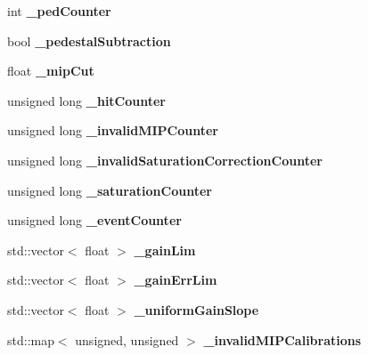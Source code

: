 \begin{DoxyCompactItemize}
\item 
int {\bfseries \-\_\-ped\-Counter}\label{classCALICE_1_1IntegratedScECALCalibrationProcessor_ad2e2dfb9ed38a0fb477e49422affe3db}

\item 
bool {\bfseries \-\_\-pedestal\-Subtraction}\label{classCALICE_1_1IntegratedScECALCalibrationProcessor_abb28167c1947ecb2fa63693acb5088a7}

\item 
float {\bfseries \-\_\-mip\-Cut}\label{classCALICE_1_1IntegratedScECALCalibrationProcessor_a9aa1b3b1267dfb7d9f93779f365171e2}

\item 
unsigned long {\bfseries \-\_\-hit\-Counter}\label{classCALICE_1_1IntegratedScECALCalibrationProcessor_ae7f0adccf76ae6c22c6e5f748d8c9899}

\item 
unsigned long {\bfseries \-\_\-invalid\-M\-I\-P\-Counter}\label{classCALICE_1_1IntegratedScECALCalibrationProcessor_a32073bf9073c927af764495b53a0dc97}

\item 
unsigned long {\bfseries \-\_\-invalid\-Saturation\-Correction\-Counter}\label{classCALICE_1_1IntegratedScECALCalibrationProcessor_a99fd828abc1342d785aaf6a68d78a94b}

\item 
unsigned long {\bfseries \-\_\-saturation\-Counter}\label{classCALICE_1_1IntegratedScECALCalibrationProcessor_a2d2db54c3e186e77f0f3a02ce8bf2254}

\item 
unsigned long {\bfseries \-\_\-event\-Counter}\label{classCALICE_1_1IntegratedScECALCalibrationProcessor_a934d12f20ce5258bd13386757d521b0f}

\item 
std\-::vector$<$ float $>$ {\bfseries \-\_\-gain\-Lim}\label{classCALICE_1_1IntegratedScECALCalibrationProcessor_a11b496da02ff2a2fe2b96fdd4b4dde44}

\item 
std\-::vector$<$ float $>$ {\bfseries \-\_\-gain\-Err\-Lim}\label{classCALICE_1_1IntegratedScECALCalibrationProcessor_a0eda6f27afb85a12b296cbc9340d2459}

\item 
std\-::vector$<$ float $>$ {\bfseries \-\_\-uniform\-Gain\-Slope}\label{classCALICE_1_1IntegratedScECALCalibrationProcessor_a42ae562273b47e5733ea2d3c2473a68c}

\item 
std\-::map$<$ unsigned, unsigned $>$ {\bfseries \-\_\-invalid\-M\-I\-P\-Calibrations}\label{classCALICE_1_1IntegratedScECALCalibrationProcessor_a2699b026f88dd2671d112a050ba71b03}


\end{DoxyCompactItemize}
